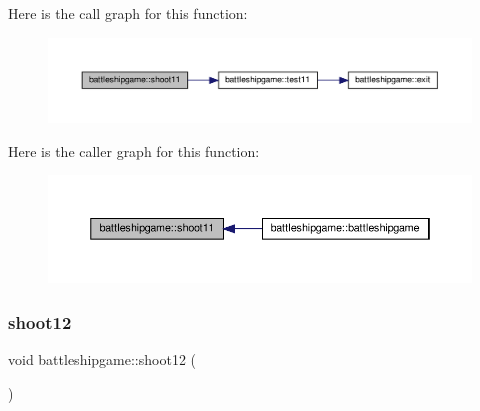 Here is the call graph for this function\+:
\nopagebreak
\begin{figure}[H]
\begin{center}
\leavevmode
\includegraphics[width=350pt]{classbattleshipgame_abe53aab52ef793e5ca534fa53768ca49_cgraph}
\end{center}
\end{figure}
Here is the caller graph for this function\+:
\nopagebreak
\begin{figure}[H]
\begin{center}
\leavevmode
\includegraphics[width=350pt]{classbattleshipgame_abe53aab52ef793e5ca534fa53768ca49_icgraph}
\end{center}
\end{figure}
\mbox{\label{classbattleshipgame_a297eea8922b7e2b678d31396da8ba96e}} 
\subsubsection{\texorpdfstring{shoot12}{shoot12}}
{\footnotesize\ttfamily void battleshipgame\+::shoot12 (\begin{DoxyParamCaption}{ }\end{DoxyParamCaption})\hspace{0.3cm}{\ttfamily [slot]}}

